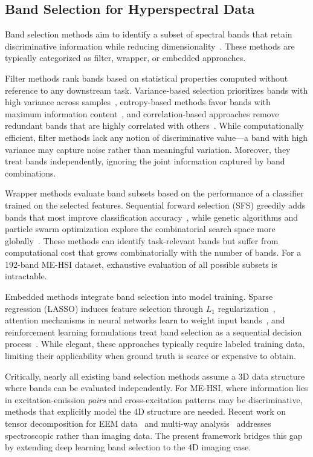 \subsection{Band Selection for Hyperspectral Data}
\label{sec:related_band}

Band selection methods aim to identify a subset of spectral bands that retain discriminative information while reducing dimensionality~\cite{sun2019hyperspectral}.
These methods are typically categorized as filter, wrapper, or embedded approaches.

Filter methods rank bands based on statistical properties computed without reference to any downstream task.
Variance-based selection prioritizes bands with high variance across samples~\cite{chang2000constrained}, entropy-based methods favor bands with maximum information content~\cite{guo2006band}, and correlation-based approaches remove redundant bands that are highly correlated with others~\cite{martinez2006comparison}.
While computationally efficient, filter methods lack any notion of discriminative value---a band with high variance may capture noise rather than meaningful variation.
Moreover, they treat bands independently, ignoring the joint information captured by band combinations.

Wrapper methods evaluate band subsets based on the performance of a classifier trained on the selected features.
Sequential forward selection (SFS) greedily adds bands that most improve classification accuracy~\cite{pudil1994floating}, while genetic algorithms and particle swarm optimization explore the combinatorial search space more globally~\cite{pal2010feature}.
These methods can identify task-relevant bands but suffer from computational cost that grows combinatorially with the number of bands.
For a 192-band ME-HSI dataset, exhaustive evaluation of all possible subsets is intractable.

Embedded methods integrate band selection into model training.
Sparse regression (LASSO) induces feature selection through $L_1$ regularization~\cite{tibshirani1996regression}, attention mechanisms in neural networks learn to weight input bands~\cite{mou2017deep}, and reinforcement learning formulations treat band selection as a sequential decision process~\cite{roy2020hybridsn}.
While elegant, these approaches typically require labeled training data, limiting their applicability when ground truth is scarce or expensive to obtain.

Critically, nearly all existing band selection methods assume a 3D data structure where bands can be evaluated independently.
For ME-HSI, where information lies in excitation-emission \emph{pairs} and cross-excitation patterns may be discriminative, methods that explicitly model the 4D structure are needed.
Recent work on tensor decomposition for EEM data~\cite{murphy2013fluorescence} and multi-way analysis~\cite{bro1997parafac} addresses spectroscopic rather than imaging data.
The present framework bridges this gap by extending deep learning band selection to the 4D imaging case.

